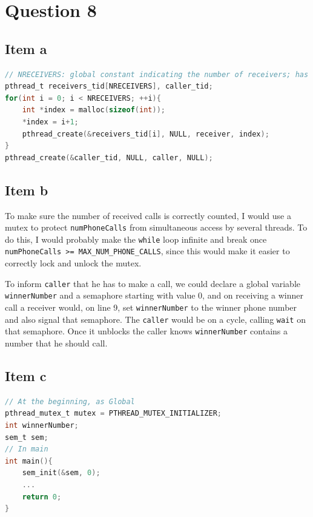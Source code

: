 {\section{Question 8}
\subsection{Item a}
\begin{lstlisting}[language=C,basicstyle=\small]
// NRECEIVERS: global constant indicating the number of receivers; has value 10
pthread_t receivers_tid[NRECEIVERS], caller_tid;
for(int i = 0; i < NRECEIVERS; ++i){
    int *index = malloc(sizeof(int));
    *index = i+1;
    pthread_create(&receivers_tid[i], NULL, receiver, index);
}
pthread_create(&caller_tid, NULL, caller, NULL);
\end{lstlisting}

\subsection{Item b}
To make sure the number of received calls is correctly counted, I would use a mutex to protect \texttt{numPhoneCalls} from simultaneous access by several threads. To do this, I would probably make the \texttt{while} loop infinite and break once \texttt{numPhoneCalls >= MAX\_NUM\_PHONE\_CALLS}, since this would make it easier to correctly lock and unlock the mutex.

To inform \texttt{caller} that he has to make a call, we could declare a global variable \texttt{winnerNumber} and a semaphore starting with value 0, and on receiving a winner call a receiver would, on line 9, set \texttt{winnerNumber} to the winner phone number and also signal that semaphore. The \texttt{caller} would be on a cycle, calling \texttt{wait} on that semaphore. Once it unblocks the caller knows \texttt{winnerNumber} contains a number that he should call.

\subsection{Item c}
\begin{lstlisting}[language=C,basicstyle=\small]
// At the beginning, as Global
pthread_mutex_t mutex = PTHREAD_MUTEX_INITIALIZER;
int winnerNumber;
sem_t sem;
// In main
int main(){
    sem_init(&sem, 0);
    ...
    return 0;
}
\end{lstlisting}

}
